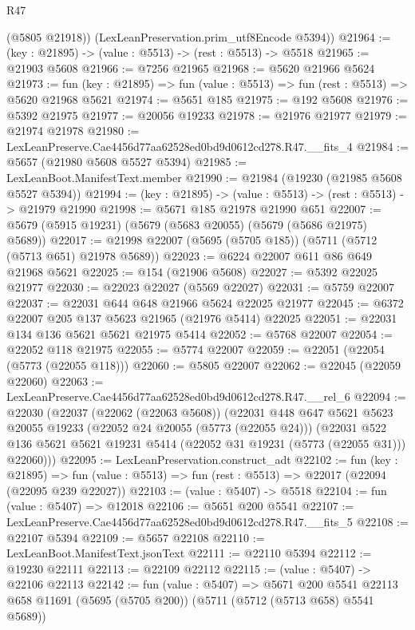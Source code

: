 \begin{lexlean}{R47}
\begin{coremodule}
        (@5805 @21918))
      (LexLeanPreservation.prim_utf8Encode @5394))
@21964 := (key : @21895) -> (value : @5513) -> (rest : @5513) -> @5518
@21965 := @21903 @5608
@21966 := @7256 @21965
@21968 := @5620 @21966 @5624
@21973 := fun (key : @21895) => fun (value : @5513) => fun (rest : @5513) => @5620 @21968 @5621
@21974 := @5651 @185
@21975 := @192 @5608
@21976 := @5392 @21975
@21977 := @20056 @19233
@21978 := @21976 @21977
@21979 := @21974 @21978
@21980 := LexLeanPreserve.Cae4456d77aa62528ed0bd9d0612cd278.R47.__fits_4
@21984 := @5657 (@21980 @5608 @5527 @5394)
@21985 := LexLeanBoot.ManifestText.member
@21990 := @21984 (@19230 (@21985 @5608 @5527 @5394))
@21994 := (key : @21895) -> (value : @5513) -> (rest : @5513) -> @21979 @21990
@21998 := @5671 @185 @21978 @21990 @651
@22007 := @5679 (@5915 @19231) (@5679 (@5683 @20055) (@5679 (@5686 @21975) @5689))
@22017 := @21998 @22007 (@5695 (@5705 @185)) (@5711 (@5712 (@5713 @651) @21978 @5689))
@22023 := @6224 @22007 @611 @86 @649 @21968 @5621
@22025 := @154 (@21906 @5608)
@22027 := @5392 @22025 @21977
@22030 := @22023 @22027 (@5569 @22027)
@22031 := @5759 @22007
@22037 := @22031 @644 @648 @21966 @5624 @22025 @21977
@22045 := @6372 @22007 @205 @137 @5623 @21965 (@21976 @5414) @22025
@22051 := @22031 @134 @136 @5621 @5621 @21975 @5414
@22052 := @5768 @22007
@22054 := @22052 @118 @21975
@22055 := @5774 @22007
@22059 := @22051 (@22054 (@5773 (@22055 @118)))
@22060 := @5805 @22007
@22062 := @22045 (@22059 @22060)
@22063 := LexLeanPreserve.Cae4456d77aa62528ed0bd9d0612cd278.R47.__rel_6
@22094 := @22030
    (@22037
      (@22062 (@22063 @5608))
      (@22031
        @448
        @647
        @5621
        @5623
        @20055
        @19233
        (@22052 @24 @20055 (@5773 (@22055 @24)))
        (@22031
          @522
          @136
          @5621
          @5621
          @19231
          @5414
          (@22052 @31 @19231 (@5773 (@22055 @31)))
          @22060)))
@22095 := LexLeanPreservation.construct_adt
@22102 := fun (key : @21895) =>
  fun (value : @5513) => fun (rest : @5513) => @22017 (@22094 (@22095 @239 @22027))
@22103 := (value : @5407) -> @5518
@22104 := fun (value : @5407) => @12018
@22106 := @5651 @200 @5541
@22107 := LexLeanPreserve.Cae4456d77aa62528ed0bd9d0612cd278.R47.__fits_5
@22108 := @22107 @5394
@22109 := @5657 @22108
@22110 := LexLeanBoot.ManifestText.jsonText
@22111 := @22110 @5394
@22112 := @19230 @22111
@22113 := @22109 @22112
@22115 := (value : @5407) -> @22106 @22113
@22142 := fun (value : @5407) =>
  @5671
    @200
    @5541
    @22113
    @658
    @11691
    (@5695 (@5705 @200))
    (@5711 (@5712 (@5713 @658) @5541 @5689))

\end{coremodule}
\end{lexlean}
